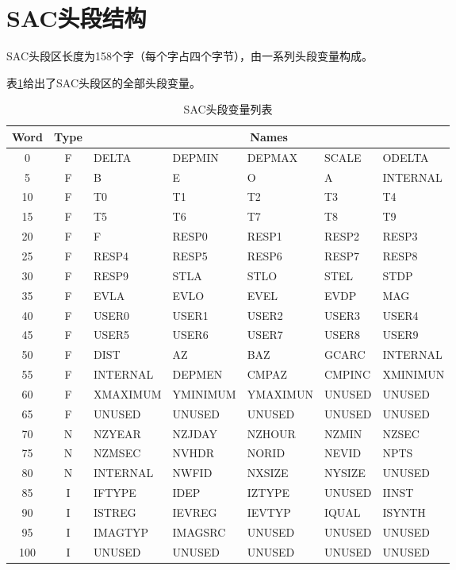 \section{SAC头段结构}
SAC头段区长度为158个字（每个字占四个字节），由一系列头段变量构成。

表\ref{table:header-variables}给出了SAC头段区的全部头段变量。

\begin{table}[H]
\centering
\caption{SAC头段变量列表}
\label{table:header-variables}
\begin{tabular}{c|c|lllll}
	\toprule
	Word	&	Type	&	\multicolumn{5}{c}{Names}\\
	\midrule
	0		&	F	&	DELTA	&	DEPMIN	&	DEPMAX	&	SCALE	&	ODELTA	\\
	5		&	F	&	B		&	E		&	O		&	A		&	INTERNAL\\
	10		&	F	&	T0		&	T1		&	T2		&	T3		&	T4		\\
	15		&	F	&	T5		&	T6		&	T7		&	T8		&	T9		\\
	20		&	F	&	F		&	RESP0	&	RESP1	&	RESP2	&	RESP3	\\
	25		&	F	&	RESP4	&	RESP5	&	RESP6	&	RESP7	&	RESP8	\\
	30		&	F	&	RESP9	&	STLA	&	STLO	&	STEL	&	STDP	\\
	35		&	F	&	EVLA	&	EVLO	&	EVEL	&	EVDP	&	MAG		\\
	40		&	F	&	USER0	&	USER1	&	USER2	&	USER3	&	USER4	\\
	45		&	F	&	USER5	&	USER6	&	USER7	&	USER8	&	USER9	\\
	50		&	F	&	DIST	&	AZ		&	BAZ		&	GCARC	&	INTERNAL\\
	55		&	F	&	INTERNAL&	DEPMEN	&	CMPAZ	&	CMPINC	&	XMINIMUN\\
	60		&	F	&	XMAXIMUM&	YMINIMUM&	YMAXIMUN&	UNUSED	&	UNUSED	\\
	65		&	F	&	UNUSED	&	UNUSED	&	UNUSED	&	UNUSED	&	UNUSED	\\
	70		&	N	&	NZYEAR	&	NZJDAY	&	NZHOUR	&	NZMIN	&	NZSEC	\\
	75		&	N	&	NZMSEC	&	NVHDR	&	NORID	&	NEVID	&	NPTS	\\
	80		&	N	&	INTERNAL&	NWFID	&	NXSIZE	&	NYSIZE	&	UNUSED	\\
	85		&	I	&	IFTYPE	&	IDEP	&	IZTYPE	&	UNUSED	&	IINST	\\
	90		&	I	&	ISTREG	&	IEVREG	&	IEVTYP	&	IQUAL	&	ISYNTH	\\
	95		&	I	&	IMAGTYP	&	IMAGSRC	&	UNUSED	&	UNUSED	&	UNUSED	\\
	100		&	I	&	UNUSED	&	UNUSED	&	UNUSED	&	UNUSED	&	UNUSED	\\

\end{tabular}
\end{table}
